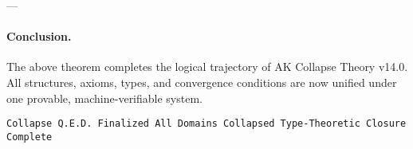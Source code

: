 \documentclass[11pt]{article}
\begin{document}
---

\paragraph{Conclusion.}
The above theorem completes the logical trajectory of AK Collapse Theory v14.0.  
All structures, axioms, types, and convergence conditions are now unified under one provable, machine-verifiable system.

\vspace{1em}
\begin{flushright}
\texttt{Collapse Q.E.D. Finalized \quad All Domains Collapsed \quad Type-Theoretic Closure Complete}
\end{flushright}
\end{document}
